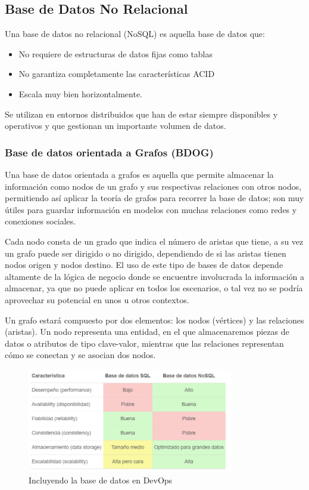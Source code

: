 \documentclass[preprint,12pt]{elsarticle}
\begin{document}

\subsection {\textbf{Base de Datos No Relacional}}

Una base de datos no relacional (NoSQL) es aquella base de datos que:

\begin{itemize}
	\item No requiere de estructuras de datos fijas como tablas
	\item No garantiza completamente las características ACID
	\item Escala muy bien horizontalmente.
\end{itemize}

Se utilizan en entornos distribuidos que han de estar siempre disponibles y operativos y que gestionan un importante volumen de datos.


\subsubsection{\textbf{Base de datos orientada a Grafos (BDOG)}}

Una base de datos orientada a grafos es aquella que permite almacenar la información como nodos de un grafo y sus respectivas relaciones con otros nodos, permitiendo así aplicar la teoría de grafos para recorrer la base de datos; son muy útiles para guardar información en modelos con muchas relaciones como redes y conexiones sociales. 

Cada nodo consta de un grado que indica el número de aristas que tiene, a su vez un grafo puede ser dirigido o no dirigido, dependiendo de si las aristas tienen nodos origen y nodos destino. El uso de este tipo de bases de datos depende altamente de la lógica de negocio donde se encuentre involucrada la información a almacenar, ya que no puede aplicar en todos los escenarios, o tal vez no se podría aprovechar su potencial en unos u otros contextos. 

Un grafo estará compuesto por dos elementos: los nodos (vértices) y las relaciones (aristas). Un nodo representa una entidad, en el que almacenaremos piezas de datos o atributos de tipo clave-valor, mientras que las relaciones representan cómo se conectan y se asocian dos nodos.

\begin{figure}[htb]
	\begin{center}
		\includegraphics[width=9cm]{./IMAGENES/basededatos_3} 
		\caption{Incluyendo la base de datos en DevOps}
	\end{center}
\end{figure}
\end{document}
